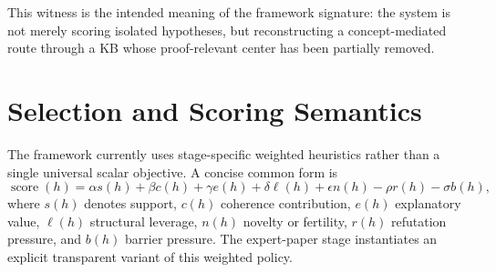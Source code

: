 \documentclass[11pt]{article}
\begin{document}
This witness is the intended meaning of the framework signature: the system is not merely scoring isolated hypotheses, but reconstructing a concept-mediated route through a KB whose proof-relevant center has been partially removed.
\section{Selection and Scoring Semantics}
The framework currently uses stage-specific weighted heuristics rather than a single universal scalar objective. A concise common form is
\[
\operatorname{score}(h) = \alpha s(h) + \beta c(h) + \gamma e(h) + \delta \ell(h) + \epsilon n(h) - \rho r(h) - \sigma b(h),
\]
where $s(h)$ denotes support, $c(h)$ coherence contribution, $e(h)$ explanatory value, $\ell(h)$ structural leverage, $n(h)$ novelty or fertility, $r(h)$ refutation pressure, and $b(h)$ barrier pressure. The expert-paper stage instantiates an explicit transparent variant of this weighted policy.
\end{document}
